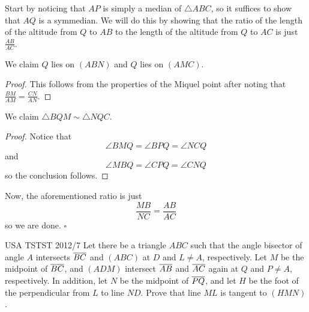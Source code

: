 \documentclass{article}
\begin{document}
Start by noticing that $AP$ is simply a median of $\triangle ABC$, so it suffices to show that $AQ$ is a symmedian. We will do this by showing that the ratio of the length of the altitude from $Q$ to $AB$ to the length of the altitude from $Q$ to $AC$ is just $\tfrac{AB}{AC}$.

\begin{claim*}
We claim $Q$ lies on $(ABN)$ and $Q$ lies on $(AMC)$.
\end{claim*}
\begin{proof}
This follows from the properties of the Miquel point after noting that $\tfrac{BM}{AM} = \tfrac{CN}{AN}$.
\end{proof}

\begin{claim*}
We claim $\triangle BQM \sim \triangle NQC$.
\end{claim*}
\begin{proof}
Notice that \[\angle BMQ = \angle BPQ = \angle NCQ\] and \[\angle MBQ = \angle CPQ = \angle CNQ\] so the conclusion follows.
\end{proof}

Now, the aforementioned ratio is just \[\dfrac{MB}{NC} = \dfrac{AB}{AC}\] so we are done. $\square$

\begin{problem}[10.26]{USA TSTST 2012/7}
Let there be a triangle $ABC$ such that the angle bisector of angle $A$ intersects $\overline{BC}$ and $(ABC)$ at $D$ and $L \neq A$, respectively. Let $M$ be the midpoint of $\overline{BC}$, and $(ADM)$ intersect $\overline{AB}$ and $\overline{AC}$ again at $Q$ and $P \neq A$, respectively. In addition, let $N$ be the midpoint of $\overline{PQ}$, and let $H$ be the foot of the perpendicular from $L$ to line $ND$. Prove that line $ML$ is tangent to $(HMN)$.
\end{problem}
\end{document}
